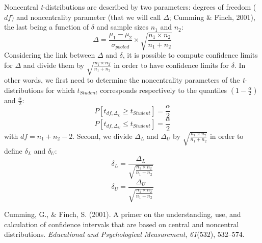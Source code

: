 \documentclass[
  english,
  man,floatsintext]{apa6}
\begin{document}
Noncentral \emph{t}-distributions are described by two parameters: degrees of freedom (\(df\)) and noncentrality parameter (that we will call \(\Delta\); Cumming \& Finch, 2001), the last being a function of \(\delta\) and sample sizes \(n_1\) and \(n_2\):
\begin{equation*}
\Delta = \frac{\mu_1-\mu_2}{\sigma_{pooled}} \times \sqrt{\frac{n_1 \times n_2}{n_1 + n_2}}
\label{eq:ncp}
\end{equation*}
Considering the link between \(\Delta\) and \(\delta\), it is possible to compute confidence limits for \(\Delta\) and divide them by \(\sqrt{\frac{n_1 \times n_2}{n_1 + n_2}}\) in order to have confidence limits for \(\delta\). In other words, we first need to determine the noncentrality parameters of the \emph{t}-distributions for which \(t_{Student}\) corresponds respectively to the quantiles \(\left(1-\frac{\alpha}{2}\right)\) and \(\frac{\alpha}{2}\):
\[P[t_{df, \Delta_L} \geq t_{Student}] = \frac{\alpha}{2} \]
\[P[t_{df, \Delta_U} \leq t_{Student}] = \frac{\alpha}{2} \]
with \(df = n_1+n_2-2\). Second, we divide \(\Delta_L\) and \(\Delta_U\) by \(\sqrt{\frac{n_1 \times n_2}{n_1 + n_2}}\) in order to define \(\delta_L\) and \(\delta_U\):
\[\delta_L = \frac{\Delta_L}{\sqrt{\frac{n_1 \times n_2}{n_1 + n_2}}}\]
\[\delta_U = \frac{\Delta_U}{\sqrt{\frac{n_1 \times n_2}{n_1 + n_2}}}\]

\hypertarget{refs}{}
\leavevmode\hypertarget{ref-Cumming_Finch_2001}{}%
Cumming, G., \& Finch, S. (2001). A primer on the understanding, use, and calculation of confidence intervals that are based on central and noncentral distributions. \emph{Educational and Psychological Measurement}, \emph{61}(532), 532--574.
\end{document}
